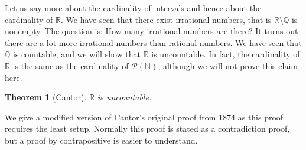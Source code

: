 \documentclass[12pt]{book}
\newcommand{\R}{{\mathbb{R}}}
\newcommand{\N}{{\mathbb{N}}}
\newcommand{\Q}{{\mathbb{Q}}}
\newcommand{\sP}{{\mathcal{P}}}
\theoremstyle{plain}
\newtheorem{thm}{Theorem}[section]
\theoremstyle{remark}
\theoremstyle{definition}
\theoremstyle{exercise}
\theoremstyle{example}
\begin{document}
Let us say more about the cardinality of intervals and hence about the
cardinality of $\R$.  We have seen that there exist irrational numbers, that is
$\R \setminus \Q$ is nonempty.  The question is: How many irrational numbers
are there?  It turns out there are a lot more irrational numbers than rational
numbers.  We have seen that $\Q$ is countable, and we will show 
that $\R$ is uncountable.
In fact, the cardinality of $\R$ is the
same as the cardinality of $\sP(\N)$, although we will not prove this
claim here.

\begin{thm}[Cantor]
$\R$ is uncountable.
\end{thm}

We give a modified version of
Cantor's original proof from
1874 as this proof requires the least setup.  Normally this proof is stated
as a contradiction proof, but a proof by contrapositive is easier to
understand.
\end{document}
